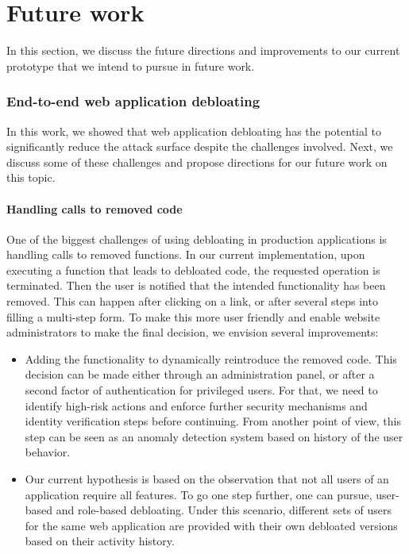 \chapter{Future work}
In this section, we discuss the future directions and improvements to our current prototype that we intend to pursue in future work.

\subsection{End-to-end web application debloating}
In this work, we showed that web application debloating has the potential to significantly reduce the attack surface despite the challenges involved. Next, we discuss some of these challenges and propose directions for our future work on this topic.

\subsubsection{Handling calls to removed code}
One of the biggest challenges of using debloating in production applications is handling calls to removed functions. In our current implementation, upon executing a function that leads to debloated code, the requested operation is terminated. Then the user is notified that the intended functionality has been removed. This can happen after clicking on a link, or after several steps into filling a multi-step form. To make this more user friendly and enable website administrators to make the final decision, we envision several improvements:
\begin{itemize}

\item Adding the functionality to dynamically reintroduce the removed
code. This decision can be made either through an administration panel, or
after a second factor of authentication for privileged users. For that, we
need to identify high-risk actions and enforce further security mechanisms
and identity verification steps before continuing. From another point of
view, this step can be seen as an anomaly detection system based on history
of the user behavior.

\item Our current hypothesis is based on the observation that not all users of
an application require all features. To go one step further, one can pursue,
user-based and role-based debloating. Under this scenario, different sets of users
for the same web application are provided with their own debloated versions
based on their activity history.
\end{itemize}

